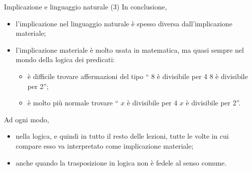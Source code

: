 \documentclass[10pt,dvipsnames,handout]{beamer}
\begin{document}
\begin{frame}{Implicazione e linguaggio naturale (3)}
    In conclusione,
    \begin{itemize}
        \item l'implicazione nel linguaggio naturale è spesso diversa dall'implicazione materiale;
        \item l'implicazione materiale è molto usata in matematica, ma quasi sempre nel mondo della logica dei predicati:
              \begin{itemize}
                  \item è difficile trovare affermazioni del tipo `` 8 è divisibile per 4  8 è divisibile per 2'';
                  \item è molto più normale trovare `` $x$ è divisibile per 4  $x$ è divisibile per 2''.
              \end{itemize}
    \end{itemize}
    \pause
    Ad ogni modo,
    \begin{itemize}
        \item nella logica, e quindi in tutto il resto delle lezioni, tutte le volte in cui compare  esso va interpretato come implicazione materiale;
        \item anche quando la trasposizione in logica non è fedele al senso comune.
    \end{itemize}
\end{frame}
\end{document}
